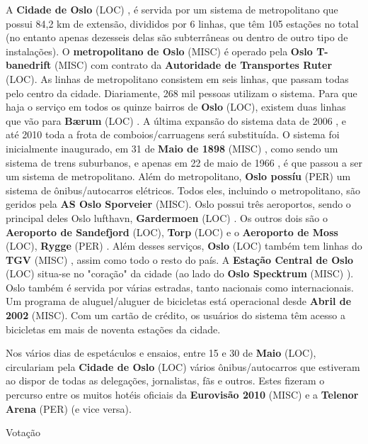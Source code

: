 \documentclass[12pt,a4paper]{article}
\begin{document}
A \textbf{Cidade de Oslo} (LOC) , é servida por um sistema de metropolitano que possui 84,2 km de extensão, divididos por 6 linhas, que têm 105 estações no total (no entanto apenas dezesseis delas são subterrâneas ou dentro de outro tipo de instalações). O \textbf{metropolitano de Oslo} (MISC) é operado pela \textbf{Oslo T-banedrift} (MISC) com contrato da \textbf{Autoridade de Transportes Ruter} (LOC). As linhas de metropolitano consistem em seis linhas, que passam todas pelo centro da cidade. Diariamente, 268 mil pessoas utilizam o sistema. Para que haja o serviço em todos os quinze bairros de \textbf{Oslo} (LOC), existem duas linhas que vão para \textbf{Bærum} (LOC) . A última expansão do sistema data de 2006 , e até 2010 toda a frota de comboios/carruagens será substituída. O sistema foi inicialmente inaugurado, em 31 de \textbf{Maio de 1898} (MISC) , como sendo um sistema de trens suburbanos, e apenas em 22 de maio de 1966 , é que passou a ser um sistema de metropolitano. Além do metropolitano, \textbf{Oslo possíu} (PER) um sistema de ônibus/autocarros elétricos. Todos eles, incluindo o metropolitano, são geridos pela \textbf{AS Oslo Sporveier} (MISC). Oslo possui três aeroportos, sendo o principal deles Oslo lufthavn, \textbf{Gardermoen} (LOC) . Os outros dois são o \textbf{Aeroporto de Sandefjord} (LOC), \textbf{Torp} (LOC) e o \textbf{Aeroporto de Moss} (LOC), \textbf{Rygge} (PER) . Além desses serviços, \textbf{Oslo} (LOC) também tem linhas do \textbf{TGV} (MISC) , assim como todo o resto do país. A \textbf{Estação Central de Oslo} (LOC) situa-se no "coração" da cidade (ao lado do \textbf{Oslo Specktrum} (MISC) ). Oslo também é servida por várias estradas, tanto nacionais como internacionais. Um programa de aluguel/aluguer de bicicletas está operacional desde \textbf{Abril de 2002} (MISC). Com um cartão de crédito, os usuários do sistema têm acesso a bicicletas em mais de noventa estações da cidade.

Nos vários dias de espetáculos e ensaios, entre 15 e 30 de \textbf{Maio} (LOC), circulariam pela \textbf{Cidade de Oslo} (LOC) vários ônibus/autocarros que estiveram ao dispor de todas as delegações, jornalistas, fãs e outros. Estes fizeram o percurso entre os muitos hotéis oficiais da \textbf{Eurovisão 2010} (MISC) e a \textbf{Telenor Arena} (PER) (e vice versa).



Votação
\end{document}
